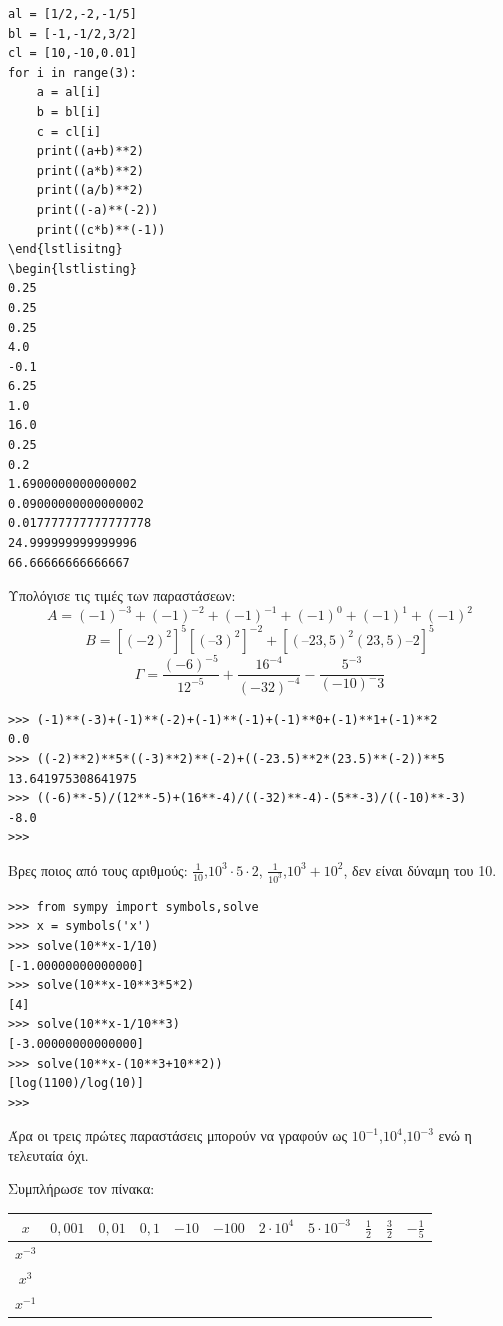 \begin{lstlisting}
al = [1/2,-2,-1/5]
bl = [-1,-1/2,3/2]
cl = [10,-10,0.01]
for i in range(3):
    a = al[i]
    b = bl[i]
    c = cl[i]
    print((a+b)**2)
    print((a*b)**2)
    print((a/b)**2)
    print((-a)**(-2))
    print((c*b)**(-1))
\end{lstlisitng}
\begin{lstlisting}
0.25
0.25
0.25
4.0
-0.1
6.25
1.0
16.0
0.25
0.2
1.6900000000000002
0.09000000000000002
0.017777777777777778
24.999999999999996
66.66666666666667
\end{lstlisting}
\begin{exercise}
Υπολόγισε	τις	τιμές	των	παραστάσεων:
$$Α	=	(-1)^{-3}+(-1)^{-2}+(-1)^{-1}+(-1)^0+(-1)^1+(-1)^2$$
$$Β	=	[(-2)^2]^5[(–3)^2]^{-2}+[(–23,5)^2(23,5)–2]^5$$
$$\Gamma = \frac{(-6)^{-5}}{12^{-5}}+\frac{16^{-4}}{(-32)^{-4}}-\frac{5^{-3}}{(-10)^-3}$$
\end{exercise}
\begin{lstlisting}
>>> (-1)**(-3)+(-1)**(-2)+(-1)**(-1)+(-1)**0+(-1)**1+(-1)**2
0.0
>>> ((-2)**2)**5*((-3)**2)**(-2)+((-23.5)**2*(23.5)**(-2))**5
13.641975308641975
>>> ((-6)**-5)/(12**-5)+(16**-4)/((-32)**-4)-(5**-3)/((-10)**-3)
-8.0
>>>
\end{lstlisting}
\begin{exercise}
Βρες ποιος από τους αριθμούς: $\frac{1}{10}$,$10^3\cdot 5 \cdot 2$, $\frac{1}{10^3}$,$10^3+10^2$, δεν είναι δύναμη του 10.
\end{exercise}
\begin{lstlisting}
>>> from sympy import symbols,solve
>>> x = symbols('x')
>>> solve(10**x-1/10)
[-1.00000000000000]
>>> solve(10**x-10**3*5*2)
[4]
>>> solve(10**x-1/10**3)
[-3.00000000000000]
>>> solve(10**x-(10**3+10**2))
[log(1100)/log(10)]
>>>
\end{lstlisting}
Άρα οι τρεις πρώτες παραστάσεις μπορούν να γραφούν ως $10^{-1}$,$10^4$,$10^{-3}$ ενώ η τελευταία όχι.
\begin{exercise}
Συμπλήρωσε τον πίνακα:
\begin{table}[ht]
\begin{tabular}{|c|c|c|c|c|c|c|c|c|c|c|}
\hline
$x$        &$0,001$&$0,01$&$0,1$&$ -10$&$ -100$&$ 2\cdot 10^4$& $5\cdot 10^{-3}$&$\frac{1}{2}$&$\frac{3}{2}$&$-\frac{1}{5}$\\\hline
$x^{-3}$ &&&&&&&&&&\\\hline
$x^3$ &&&&&&&&&&\\\hline
$x^{-1}$ &&&&&&&&&&\\\hline
\end{tabular}
\end{table}
\end{exercise}
